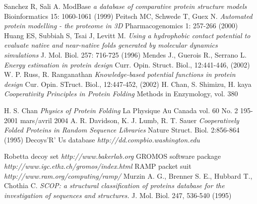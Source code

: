 \documentclass[a4paper,20pt,notitlepage,openbib]{article}
\begin{document}
\begin{thebibliography}{99}
Sanchez R, Sali A. ModBase
\emph{a database of comparative protein structure models}
Bioinformatics 15: 1060-1061 (1999)
Peitsch MC, Schwede T, Guex N.
\emph{Automated protein modelling - the proteome in 3D}
Pharmacogenomics 1: 257-266 (2000)
Huang ES, Subbiah S, Tsai J, Levitt M.
\emph{Using a hydrophobic contact potential to evaluate native and near-native folds generated by molecular dynamics simulations}
J. Mol. Biol. 257: 716-725 (1996)
Mendes J., Guerois R., Serrano L.
\emph{Energy estimation in protein design}
Curr. Opin. Struct. Biol., 12:441-446, (2002)
W. P. Russ, R. Ranganathan
\emph{Knowledge-based potential functions in protein design}
Cur. Opin. STruct. Biol., 12:447-452, (2002)
H. Chan, S. Shimizu, H. kaya
\emph{Cooperativity Principles in Protein Folding }
Methods in Enzymology, vol. 380

H. S. Chan
\emph{Physics of Protein Folding}
La Physique Au Canada vol. 60 No. 2 195-2001 mars/avril 2004
A. R. Davidson, K. J. Lumb, R. T. Sauer
\emph{Cooperatively Folded Proteins in Random Sequence Libraries}
Nature Struct. Biol. 2:856-864 (1995)
Decoys'R' Us database
\emph{http://dd.compbio.washington.edu}

Robetta decoy set
\emph{http://www.bakerlab.org}
GROMOS software package
\emph{http://www.igc.ethz.ch/gromos/index.html}
RAMP packet suit
\emph{http://www.ram.org/computing/ramp/}
Murzin A. G., Brenner S. E., Hubbard T., Chothia C.
\emph{SCOP: a structural classification of proteins database for the investigation of sequences and structures. }
J. Mol. Biol. 247, 536-540 (1995)

\end{thebibliography}
\end{document}
